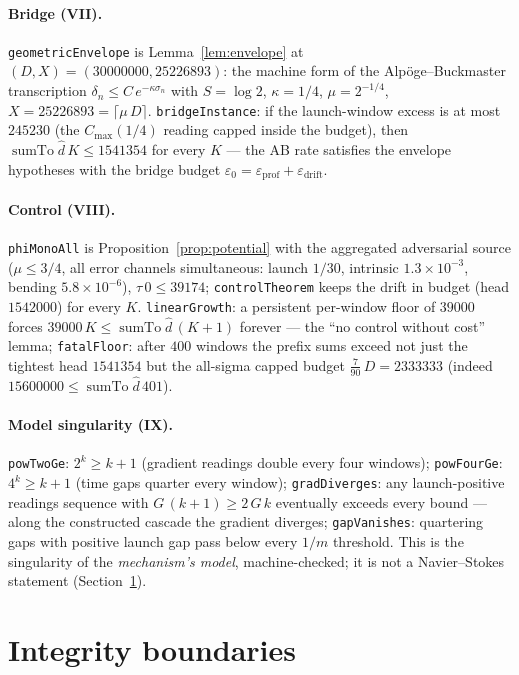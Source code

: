 \documentclass[11pt]{article}
\newcommand{\dhat}{\widehat{d}}
\newcommand{\sumto}{\operatorname{sumTo}}
\theoremstyle{plain}
\theoremstyle{definition}
\begin{document}
\paragraph{Bridge (VII).} \texttt{geometricEnvelope} is Lemma~\ref{lem:envelope} at
$(D,X)=(30000000,25226893)$: the machine form of the Alp\"oge--Buckmaster transcription
$\delta_n\le C\,e^{-\kappa\sigma_n}$ with $S=\log 2$, $\kappa=1/4$, $\mu=2^{-1/4}$,
$X=25226893=\lceil\mu\,D\rceil$. \texttt{bridgeInstance}: if the launch-window excess is
at most $245230$ (the $C_{\max}(1/4)$ reading capped inside the budget), then
$\sumto\dhat\,K\le 1541354$ for every $K$ --- the AB rate satisfies the envelope
hypotheses with the bridge budget $\varepsilon_0=\varepsilon_{\mathrm{prof}}+
\varepsilon_{\mathrm{drift}}$.

\paragraph{Control (VIII).} \texttt{phiMonoAll} is Proposition~\ref{prop:potential} with
the aggregated adversarial source ($\mu\le 3/4$, all error channels simultaneous: launch
$1/30$, intrinsic $1.3\times 10^{-3}$, bending $5.8\times 10^{-6}$), $\tau\,0\le 39174$;
\texttt{controlTheorem} keeps the drift in budget (head $1542000$) for every $K$.
\texttt{linearGrowth}: a persistent per-window floor of $39000$ forces
$39000\,K\le\sumto\dhat\,(K+1)$ forever --- the ``no control without cost'' lemma;
\texttt{fatalFloor}: after $400$ windows the prefix sums exceed not just the tightest head
$1541354$ but the all-sigma capped budget $\tfrac7{90}\,D=2333333$
(indeed $15600000\le\sumto\dhat\,401$).

\paragraph{Model singularity (IX).} \texttt{powTwoGe}: $2^{k}\ge k+1$ (gradient readings
double every four windows); \texttt{powFourGe}: $4^{k}\ge k+1$ (time gaps quarter every
window); \texttt{gradDiverges}: any launch-positive readings sequence with
$G\,(k+1)\ge 2\,G\,k$ eventually exceeds every bound --- along the constructed cascade the
gradient diverges; \texttt{gapVanishes}: quartering gaps with positive launch gap pass
below every $1/m$ threshold. This is the singularity of the \emph{mechanism's model},
machine-checked; it is not a Navier--Stokes statement (Section~\ref{sec:integrity}).

\section{Integrity boundaries}\label{sec:integrity}
\end{document}
